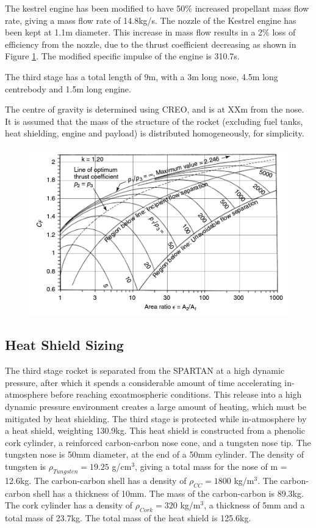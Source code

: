 	

	
The kestrel engine has been modified to have 50\% increased propellant mass flow rate, giving a mass flow rate of 14.8kg/s. The nozzle of the Kestrel engine has been kept at 1.1m diameter. This increase in mass flow results in a 2\% loss of efficiency from the nozzle\cite{RPE}, due to the thrust coefficient decreasing as shown in Figure \ref{fig:ThrustCoefficient-Arat}. The modified specific impulse of the engine is 310.7s.

The third stage has a total length of 9m, with a 3m long nose, 4.5m long centrebody and 1.5m long engine.
	
	The centre of gravity is determined using CREO, and is at XXm from the nose. It is assumed that the mass of the structure of the rocket (excluding fuel tanks, heat shielding, engine and payload) is distributed homogeneously, for simplicity.
	
	
	\begin{figure}
\centering
\includegraphics[width=0.7\linewidth]{"figures/3_vehicle_design/Thrust Coefficient - Arat"}
\caption{\cite{RPE}}
\label{fig:ThrustCoefficient-Arat}
\end{figure}



\subsection{Heat Shield Sizing}

The third stage rocket is separated from the SPARTAN at a high dynamic pressure, after which it spends a considerable amount of time accelerating in-atmosphere before reaching exoatmospheric conditions. This release into a high dynamic pressure environment creates a large amount of heating, which must be mitigated by heat shielding. 
The third stage is protected while in-atmosphere by a heat shield, weighting 130.9kg. This heat shield is constructed from a phenolic cork cylinder, a reinforced carbon-carbon nose cone, and a tungsten nose tip. 
The tungsten nose is 50mm diameter, at the end of a 50mm cylinder. The density of tungsten is $\rho_{Tungsten} = 19.25$  g/cm$^3$, giving a total mass for the nose of m = 12.6kg.
The carbon-carbon shell has a density of $\rho_{CC} = 1800$  kg/m$^3$. The carbon-carbon shell has a thickness of 10mm. The mass of the carbon-carbon is 89.3kg. 
The cork cylinder has a density of $\rho_{Cork} = 320$  kg/m$^3$, a thickness of 5mm and a total mass of 23.7kg. 
The total mass of the heat shield is 125.6kg.
		
